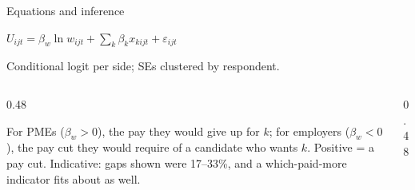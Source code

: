 
\begin{frame}[t,label=B-methods]{Equations and inference}
  \FrameTop %
  {\centering\fontsize{10}{12}\selectfont $U_{ijt}=\beta_w\ln w_{ijt}+\sum_k\beta_k x_{kijt}+\varepsilon_{ijt}$\par}
  \vspace{0.04cm}
  {\centering\color{Muted}\fontsize{8.5}{10.2}\selectfont Conditional logit per side; SEs clustered by respondent.\par}
  \vspace{0.08cm}
  \begin{columns}[T,onlytextwidth]
    \begin{column}{0.48\textwidth}
      {\fontsize{9}{11}\selectfont\RaggedRight For PMEs ($\beta_w>0$), the pay they would give up for $k$; for employers ($\beta_w<0$), the pay cut they would require of a candidate who wants $k$. Positive = a pay cut. Indicative: gaps shown were 17--33\%, and a which-paid-more indicator fits about as well.\par}
    \end{column}
    \begin{column}{0.48\textwidth}

\end{column}
\end{columns}
\end{frame}
